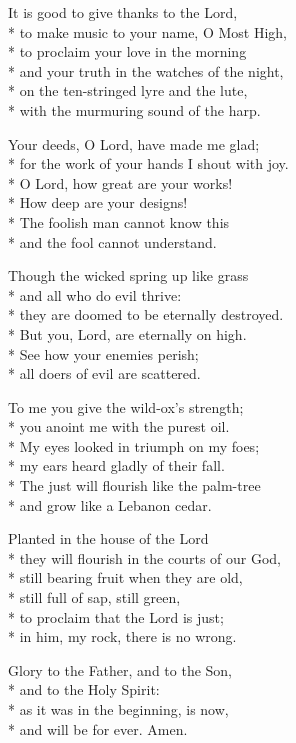 It is good to give thanks to the Lord, \\*
to make music to your name, O Most High, \\*
to proclaim your love in the morning \\*
and your truth in the watches of the night, \\*
on the ten-stringed lyre and the lute, \\*
with the murmuring sound of the harp.

Your deeds, O Lord, have made me glad; \\*
for the work of your hands I shout with joy.\\*
O Lord, how great are your works! \\*
How deep are your designs!\\*
The foolish man cannot know this \\*
and the fool cannot understand.

Though the wicked spring up like grass \\*
and all who do evil thrive:\\*
they are doomed to be eternally destroyed. \\*
But you, Lord, are eternally on high.\\*
See how your enemies perish; \\*
all doers of evil are scattered.

To me you give the wild-ox's strength; \\*
you anoint me with the purest oil.\\*
My eyes looked in triumph on my foes; \\*
my ears heard gladly of their fall.\\*
The just will flourish like the palm-tree \\*
and grow like a Lebanon cedar.

 Planted in the house of the Lord \\*
they will flourish in the courts of our God,\\*
still bearing fruit when they are old, \\*
still full of sap, still green,\\*
to proclaim that the Lord is just; \\*
in him, my rock, there is no wrong.

Glory to the Father, and to the Son, \\*
and to the Holy Spirit: \\*
as it was in the beginning, is now, \\*
and will be for ever. Amen.